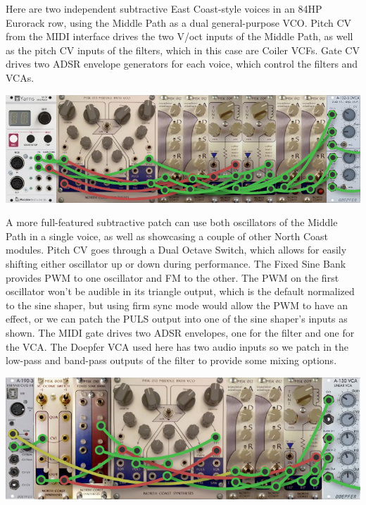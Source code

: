 Here are two independent subtractive East Coast-style voices in an 84HP
Eurorack row, using the Middle Path as a dual general-purpose VCO.  Pitch CV
from the MIDI interface drives the two V/oct inputs of the Middle Path, as
well as the pitch CV inputs of the filters, which in this case are Coiler
VCFs.  Gate CV drives two ADSR envelope generators for each voice, which
control the filters and VCAs.

\nopagebreak\noindent
{\hspace*{\fill}\includegraphics[width=\linewidth]{mp-patch2.png}\hspace*{\fill}\par} 

A more full-featured subtractive patch can use both oscillators of the Middle
Path in a single voice, as well as showcasing a couple of other North Coast
modules.  Pitch CV goes through a Dual Octave Switch, which allows for
easily shifting either oscillator up or down during performance.  The Fixed
Sine Bank provides PWM to one oscillator and FM to the other.  The PWM on
the first oscillator won't be audible in its triangle output, which is the
default normalized to the sine shaper, but using firm sync mode would allow
the PWM to have an effect, or we can patch the PULS output into one of the
sine shaper's inputs as shown.  The MIDI gate drives two ADSR envelopes, one
for the filter and one for the VCA.  The Doepfer VCA used here has two audio
inputs so we patch in the low-pass and band-pass outputs of the filter to
provide some mixing options.

\nopagebreak\noindent
{\hspace*{\fill}\includegraphics[width=\linewidth]{mp-patch3.png}\hspace*{\fill}\par} 

